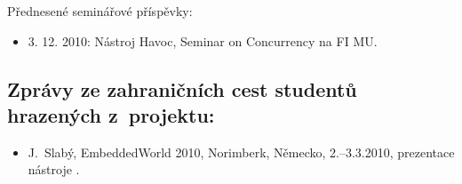 \documentclass{DG-report}
\newcommand{\note}[1]{[[ \emph{#1} ]]}
\renewcommand{\note}[1]{}
\begin{document}
\noindent Přednesené seminářové příspěvky:\begin{itemize}

  \item 3. 12. 2010: Nástroj Havoc, Seminar on Concurrency na FI MU.
  
\end{itemize}

\subsection*{Zprávy ze zahraničních cest studentů hrazených z~projektu:}

\note{Uveďte krátké zprávy ze svých zahraničních cest: zvláště krátké mohou být
u prezentace článku na nějaké konferenci, o něco delší by měly být zprávy z
letních škol a pracovních návštěv. Dodržte prosím následující formát (bude se
sestavovat do jednoho seznamu za celý projekt).}\bigskip

\begin{itemize}

  \item J.~Slabý, EmbeddedWorld 2010, Norimberk, Německo, 2.--3.3.2010,
  prezentace nástroje \cite{Slaby10a}.

\end{itemize}


\label{KONEC}

\end{document}
